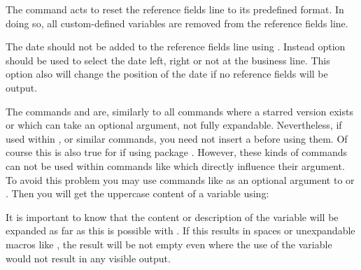 The command  acts to reset the reference
fields line to its predefined format. In doing so, all custom-defined
variables are removed from the reference fields line.

The date should not be added to the reference fields line
using . Instead option %
%
%
%
 should be used to select the date left,
right or not at the business line. This option also will change the position
of the date if no reference fields will be output.%
%
\EndIndexGroup


\begin{Declaration}
\end{Declaration}
The commands  and
 are, similarly to all commands where a
starred version exists or which can take an optional argument, not fully
expandable. Nevertheless, if used within
,
 or similar commands, you
need not insert a  before using them.  Of
course this is also true for
 if using package
. However, these kinds of
commands can not be used within commands like
which directly influence their argument.  To avoid this problem you may use
commands like  as an optional argument to
 or . Then you will get the uppercase
content of a variable using:
\begin{lstcode}[escapeinside=`']
\end{lstcode}
%
\EndIndexGroup


\begin{Declaration}
\end{Declaration}
It is important to know that the content or description of the variable will
be expanded as far as this is possible with . If this results in
spaces or unexpandable macros like , the result will be not empty
even where the use of the variable would not result in any visible output.
  
